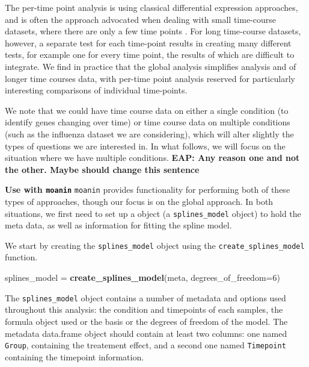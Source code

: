 \documentclass[9pt,a4paper,]{extarticle}
\newenvironment{Shaded}{\begin{snugshade}}{\end{snugshade}}
\newcommand{\DataTypeTok}[1]{\textcolor[rgb]{0.13,0.29,0.53}{#1}}
\newcommand{\DecValTok}[1]{\textcolor[rgb]{0.00,0.00,0.81}{#1}}
\newcommand{\KeywordTok}[1]{\textcolor[rgb]{0.13,0.29,0.53}{\textbf{#1}}}
\newcommand{\NormalTok}[1]{#1}
\newcommand{\StringTok}[1]{\textcolor[rgb]{0.31,0.60,0.02}{#1}}
\begin{document}
The per-time point analysis is using classical differential expression
approaches, and is often the approach advocated when dealing with small
time-course datasets, where there are only a few time points
\citep{ritchie:limma, robinson:edgeR, love:moderated} . For long time-course datasets,
however, a separate test for each time-point results in creating many
different tests, for example one for every time point, the results of which
are difficult to integrate. We find in practice that the global analysis
simplifies analysis and of longer time courses data, with per-time point
analysis reserved for particularly interesting comparisons of individual
time-points.

We note that we could have time course data on either a single condition (to
identify genes changing over time) or
time course data on multiple conditions (such as the influenza dataset we are
considering), which will alter slightly the types of questions we are
interested in.
In what follows, we will focus on the situation
where we have multiple conditions. \textbf{EAP: Any reason one and not the other.
Maybe should change this sentence}

\textbf{Use with \texttt{moanin}} \texttt{moanin} provides functionality for performing both of
these types of approaches, though our focus is on the global approach. In both
situations, we first need to set up a object (a \texttt{splines\_model} object) to
hold the meta data, as well as information for fitting the spline model.

We start by creating the \texttt{splines\_model} object using the
\texttt{create\_splines\_model} function.

\begin{Shaded}
\begin{Highlighting}[]
\NormalTok{splines_model =}\StringTok{ }\KeywordTok{create_splines_model}\NormalTok{(meta, }\DataTypeTok{degrees_of_freedom=}\DecValTok{6}\NormalTok{)}
\end{Highlighting}
\end{Shaded}

The \texttt{splines\_model} object contains a number of metadata and options used
throughout this analysis: the condition and timepoints of each samples, the
formula object used or the basis or the degrees of freedom of the model. The
metadata data.frame object should contain at least two columns: one named
\texttt{Group}, containing the treatement effect, and a second one named \texttt{Timepoint}
containing the timepoint information.
\end{document}
